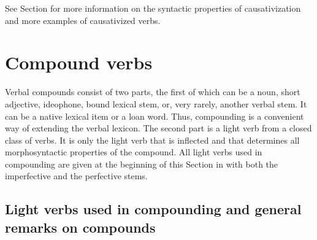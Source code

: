 See Section  for more information on the syntactic properties of causativization and more examples of causativized verbs.

\section{Compound verbs}
\label{sec:Compound verbs}
Verbal compounds consist of two parts, the first of which can be a noun, short adjective, ideophone, bound lexical stem, or, very rarely, another verbal stem. It can be a native lexical item or a loan word. Thus, compounding is a convenient way of extending the verbal lexicon. The second part is a light verb from a closed class of verbs. It is only the light verb that is inflected and that determines all morphosyntactic properties of the compound. All light verbs used in compounding are given at the beginning of this Section in  with both the imperfective and the perfective stems.


\subsection{Light verbs used in compounding and general remarks on compounds}
\label{sec:Light verbs used in compounding and general remarks on compounds}

